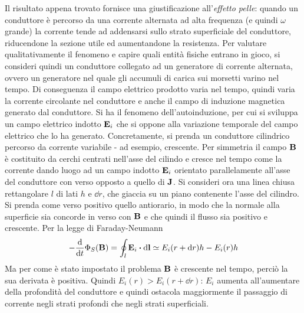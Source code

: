 Il risultato appena trovato fornisce una giustificazione all'\textit{effetto pelle}: quando un conduttore è percorso
da una corrente alternata ad alta frequenza (e quindi $\omega$ grande) la corrente tende ad addensarsi sullo strato
superficiale del conduttore, riducendone la sezione utile ed aumentandone la resistenza.
Per valutare qualitativamente il fenomeno e capire quali entità fisiche entrano in gioco,
si consideri quindi un conduttore collegato ad un generatore di corrente alternata, ovvero un generatore nel quale gli
accumuli di carica sui morsetti varino nel tempo. Di conseguenza il campo elettrico prodotto varia nel tempo,
quindi varia la corrente circolante nel conduttore e anche il campo di induzione magnetica generato dal conduttore.
Si ha il fenomeno dell'autoinduzione, per cui si sviluppa un campo elettrico indotto $\vb{E}_i$ che si oppone alla variazione
temporale del campo elettrico che lo ha generato.
Concretamente, si prenda un conduttore cilindrico percorso da corrente variabile - ad esempio, crescente.
Per simmetria il campo $\vb{B}$ è costituito da cerchi centrati nell'asse del cilindo e cresce nel tempo
come la corrente dando luogo ad un campo indotto $\vb{E}_i$ orientato parallelamente all'asse del conduttore
con verso opposto a quello di $\vb{J}$. Si consideri ora una linea chiusa rettangolare $l$ di lati $h$ e $\dd{r}$,
che giaccia su un piano contenente l'asse del cilindro. Si prenda come verso positivo quello antiorario, in modo
che la normale alla superficie sia concorde in verso con $\vb{B}$ e che quindi il flusso sia positivo e crescente.
Per la legge di Faraday-Neumann
\[
    -\dv{t}\Phi_S(\vb{B}) =\oint_l \vb{E}_i\vdot\dd{\vb{l}}\simeq E_i(r+\dd{r})h - E_i(r)h
\]
Ma per come è stato impostato il problema $\vb{B}$ è crescente nel tempo, perciò la sua derivata è positiva.
Quindi $E_i(r)>E_i(r+\dd{r})$: $E_i$ aumenta all'aumentare della profondità del conduttore
e quindi ostacola maggiormente il passaggio di corrente negli strati profondi che negli strati superficiali.

